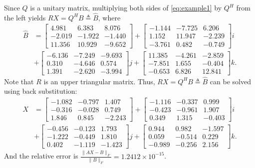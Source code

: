 \documentclass{book}
\makeatletter
\def\my@tag@font{\normalsize}
\let\amsmath@eqref\eqref
\renewcommand\eqref[1]{{\let\my@tag@font\relax\amsmath@eqref{#1}}}
\theoremstyle{remark}
\makeatother
\begin{document}
\begin{multicols}{2}
Since $Q$ is a unitary matrix, multiplying both sides of \eqref{eq:example1} by $Q^H$ from the left yields $RX = Q^HB\triangleq \widehat{B}$,
where
\begin{align*}
  \widehat{B} &=
    \begin{bmatrix}
     4.981  &  6.383  &  8.076 \\
    -2.019  & -1.922  & -1.440 \\
     11.356 &  10.929 & -9.652
    \end{bmatrix} +
    \begin{bmatrix}
    -1.144 & -7.725  &  6.206 \\
     1.152 &  11.947 & -2.239 \\
    -3.761 &  0.482  & -0.749
    \end{bmatrix} i \\ &+
    \begin{bmatrix}
    -6.136 & -7.249 & -9.693 \\
     0.310 & -4.646 &  0.574 \\
     1.391 & -2.620 & -3.994
    \end{bmatrix} j +
    \begin{bmatrix}
     11.385 & -4.261 & -2.859 \\
    -7.851  &  1.655 & -0.404 \\
    -0.653  &  6.826 &  12.841
    \end{bmatrix} k.
\end{align*}
Note that $R$ is an upper triangular matrix. Thus, $RX = Q^HB\triangleq \widehat{B}$ can be solved using back substitution:
 \begin{align*}
  X &=
    \begin{bmatrix}
    -1.082 & -0.797 &  1.407 \\
    -0.316 & -0.028 &  0.749 \\
     1.846 &  0.845 & -2.243
    \end{bmatrix} +
    \begin{bmatrix}
    -1.116 & -0.337 &  0.999 \\
    -0.423 & -0.961 &  1.907 \\
     0.349 &  1.315 & -0.403
    \end{bmatrix} i \\ &+
    \begin{bmatrix}
    -0.456 & -0.123 &  1.793 \\
    -1.222 & -0.449 &  1.810 \\
     0.402 & -1.119 & -1.423
    \end{bmatrix} j +
    \begin{bmatrix}
     0.944 &  0.982 & -1.597 \\
     0.059 & -0.514 &  0.229 \\
    -0.989 & -0.256 &  2.156
    \end{bmatrix} k.
\end{align*}
And the relative error is $\frac{\|AX - B\|_F}{\|B\|_F} = 1.2412\times 10^{-15}$.


\end{multicols}
\end{document}
